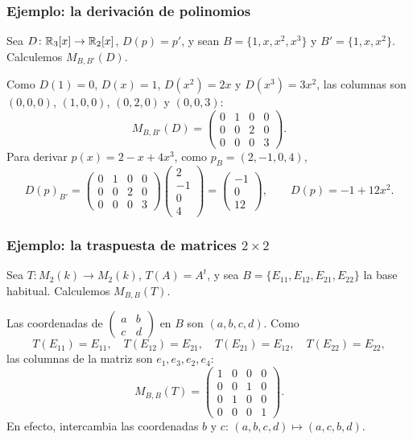 \begin{frame}
    \frametitle{Ejemplo: la derivación de polinomios}

    \begin{example}
        Sea $D\colon\mathbb{R}_3[x]\to\mathbb{R}_2[x]$, $D(p)=p'$, y sean
        $B=\{1,x,x^2,x^3\}$ y $B'=\{1,x,x^2\}$. Calculemos $M_{B,B'}(D)$.
    \end{example}

    Como $D(1)=0$, $D(x)=1$, $D(x^2)=2x$ y $D(x^3)=3x^2$, las columnas son
    $(0,0,0)$, $(1,0,0)$, $(0,2,0)$ y $(0,0,3)$:
    \[
        M_{B,B'}(D)=
        \begin{pmatrix}
            0&1&0&0\\
            0&0&2&0\\
            0&0&0&3
        \end{pmatrix}.
    \]
    Para derivar $p(x)=2-x+4x^3$, como $p_B=(2,-1,0,4)$,
    \[
        D(p)_{B'}=
        \begin{pmatrix}
            0&1&0&0\\
            0&0&2&0\\
            0&0&0&3
        \end{pmatrix}
        \begin{pmatrix}2\\-1\\0\\4\end{pmatrix}
        =\begin{pmatrix}-1\\0\\12\end{pmatrix},
        \qquad
        D(p)=-1+12x^2.
    \]
\end{frame}


\begin{frame}
    \frametitle{Ejemplo: la traspuesta de matrices $2\times2$}

    \begin{example}
        Sea $T\colon M_2(k)\to M_2(k)$, $T(A)=A^t$, y sea
        $B=\{E_{11},E_{12},E_{21},E_{22}\}$ la base habitual. Calculemos
        $M_{B,B}(T)$.
    \end{example}

    Las coordenadas de $\begin{pmatrix}a&b\\c&d\end{pmatrix}$ en $B$ son
    $(a,b,c,d)$. Como
    \[
        T(E_{11})=E_{11},\quad T(E_{12})=E_{21},\quad
        T(E_{21})=E_{12},\quad T(E_{22})=E_{22},
    \]
    las columnas de la matriz son $e_1,e_3,e_2,e_4$:
    \[
        M_{B,B}(T)=
        \begin{pmatrix}
            1&0&0&0\\
            0&0&1&0\\
            0&1&0&0\\
            0&0&0&1
        \end{pmatrix}.
    \]
    En efecto, intercambia las coordenadas $b$ y $c$:
    $(a,b,c,d)\mapsto(a,c,b,d)$.
\end{frame}


